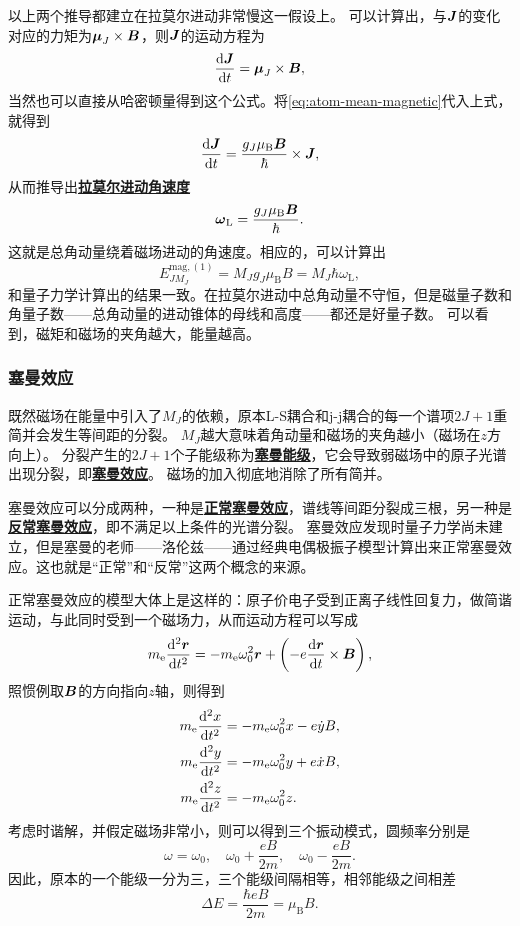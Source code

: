 \documentclass[UTF8, a4paper]{ctexart}
\newcommand*{\concept}[1]{\underline{\textbf{#1}}}
\begin{document}
以上两个推导都建立在拉莫尔进动非常慢这一假设上。
可以计算出，与$\vb*{J}$的变化对应的力矩为$\vb*{\mu}_J \times \vb*{B}$，则$\vb*{J}$的运动方程为
\[
    \dv{\vb*{J}}{t} = \vb*{\mu}_J \times \vb*{B},
\]
当然也可以直接从哈密顿量得到这个公式。将\eqref{eq:atom-mean-magnetic}代入上式，就得到
\[
    \dv{\vb*{J}}{t} = \frac{g_J \mu_\text{B} \vb*{B}}{\hbar} \times \vb*{J},
\]
从而推导出\concept{拉莫尔进动角速度}
\begin{equation}
    \vb*{\omega}_\text{L} = \frac{g_J \mu_\text{B} \vb*{B}}{\hbar}.
\end{equation}
这就是总角动量绕着磁场进动的角速度。相应的，可以计算出
\begin{equation}
    E^{\text{mag}, (1)}_{JM_J} = M_J g_J \mu_\text{B} B = M_J \hbar \omega_\text{L},
    \label{eq:small-magnetic-gapping}
\end{equation}
和量子力学计算出的结果一致。在拉莫尔进动中总角动量不守恒，但是磁量子数和角量子数——总角动量的进动锥体的母线和高度——都还是好量子数。
可以看到，磁矩和磁场的夹角越大，能量越高。

\subsubsection{塞曼效应}

既然磁场在能量中引入了$M_J$的依赖，原本L-S耦合和j-j耦合的每一个谱项$2J+1$重简并会发生等间距的分裂。
$M_J$越大意味着角动量和磁场的夹角越小（磁场在$z$方向上）。
分裂产生的$2J+1$个子能级称为\concept{塞曼能级}，它会导致弱磁场中的原子光谱出现分裂，即\concept{塞曼效应}。
磁场的加入彻底地消除了所有简并。

塞曼效应可以分成两种，一种是\concept{正常塞曼效应}，谱线等间距分裂成三根，另一种是\concept{反常塞曼效应}，即不满足以上条件的光谱分裂。
塞曼效应发现时量子力学尚未建立，但是塞曼的老师——洛伦兹——通过经典电偶极振子模型计算出来正常塞曼效应。这也就是“正常”和“反常”这两个概念的来源。

正常塞曼效应的模型大体上是这样的：原子价电子受到正离子线性回复力，做简谐运动，与此同时受到一个磁场力，从而运动方程可以写成
\begin{equation}
    m_\text{e} \dv[2]{\vb*{r}}{t} = - m_\text{e} \omega_0^2 \vb*{r} + \left( - e \dv{\vb*{r}}{t} \times \vb*{B} \right),
\end{equation}
照惯例取$\vb*{B}$的方向指向$z$轴，则得到
\[
    \begin{aligned}
        m_\text{e} \dv[2]{x}{t} &= - m_\text{e} \omega_0^2 x - e \dot{y} B, \\
        m_\text{e} \dv[2]{y}{t} &= - m_\text{e} \omega_0^2 y + e \dot{x} B, \\
        m_\text{e} \dv[2]{z}{t} &= - m_\text{e} \omega_0^2 z.
    \end{aligned}
\]
考虑时谐解，并假定磁场非常小，则可以得到三个振动模式，圆频率分别是
\begin{equation}
    \omega = \omega_0, \quad \omega_0 + \frac{eB}{2m}, \quad \omega_0 - \frac{eB}{2m}.
\end{equation}
因此，原本的一个能级一分为三，三个能级间隔相等，相邻能级之间相差
\begin{equation}
    \Delta E = \frac{\hbar eB}{2m} = \mu_\text{B} B.
\end{equation}
\end{document}
